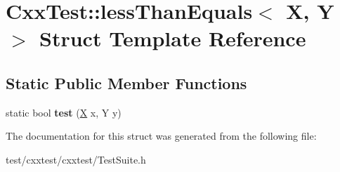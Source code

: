 \hypertarget{structCxxTest_1_1lessThanEquals}{\section{Cxx\-Test\-:\-:less\-Than\-Equals$<$ X, Y $>$ Struct Template Reference}
\label{structCxxTest_1_1lessThanEquals}
}
\subsection*{Static Public Member Functions}
\begin{DoxyCompactItemize}
\item 
\hypertarget{structCxxTest_1_1lessThanEquals_a9b071955794911f0df6be2cdb5e2c65f}{static bool {\bfseries test} (\hyperlink{classX}{X} x, Y y)}\label{structCxxTest_1_1lessThanEquals_a9b071955794911f0df6be2cdb5e2c65f}

\end{DoxyCompactItemize}


The documentation for this struct was generated from the following file\-:\begin{DoxyCompactItemize}
\item 
test/cxxtest/cxxtest/Test\-Suite.\-h\end{DoxyCompactItemize}
